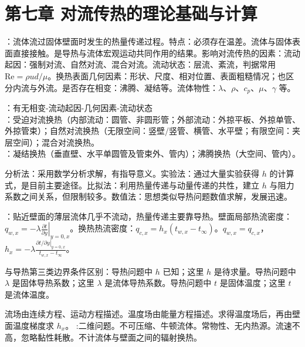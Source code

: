 \section{第七章 \quad 对流传热的理论基础与计算}

：流体流过固体壁面时发生的热量传递过程。特点：必须存在温差。流体与固体表面直接接触。是导热与流体宏观运动共同作用的结果。影响对流传热的因素：流动起因：强制对流、自然对流、混合对流。流动状态：层流、紊流，判据常用 $\mathrm{Re}=\rho ud/\mu$。换热表面几何因素：形状、尺度、相对位置、表面粗糙情况；也区分内流与外流。是否存在相变：沸腾、凝结等。流体物性：$\lambda$、$\rho$、$c_p$、$\mu$、$\gamma$ 等。


：有无相变-流动起因-几何因素-流动状态\\
：受迫对流换热（内部流动：圆管、非圆形管；外部流动：外掠平板、外掠单管、外掠管束）；自然对流换热（无限空间：竖壁/竖管、横管、水平壁；有限空间：夹层空间）；混合对流换热。\\
：凝结换热（垂直壁、水平单圆管及管束外、管内）；沸腾换热（大空间、管内）。

分析法：采用数学分析求解，有指导意义。实验法：通过大量实验获得 $h$ 的计算式，是目前主要途径。比拟法：利用热量传递与动量传递的共性，建立 $h$ 与阻力系数之间关系，但限制较多。数值法：思想类似导热问题数值求解，发展迅速。

：贴近壁面的薄层流体几乎不流动，热量传递主要靠导热。壁面局部热流密度：$q_{w,x}=-\lambda\left.\frac{\partial t}{\partial y}\right\vert_{y=0,x}$。换热热流密度：$q_{c,x}=h_x(t_{w,x}-t_{\infty})$。$q_{w,x}=q_{c,x}$，$h_x=-\lambda\frac{\left.\partial t/\partial y\right\vert_{y=0,x}}{t_{w,x}-t_{\infty}}$。

与导热第三类边界条件区别：导热问题中 $h$ 已知；这里 $h$ 是待求量。导热问题中 $\lambda$ 是固体导热系数；这里 $\lambda$ 是流体导热系数。导热问题中 $t$ 是固体温度；这里 $t$ 是流体温度。

\divider


流场由连续方程、运动方程描述。温度场由能量方程描述。求得温度场后，再由壁面温度梯度求 $h_x$。
:二维问题。不可压缩、牛顿流体。常物性、无内热源。流速不高，忽略黏性耗散。不计流体与壁面之间的辐射换热。


